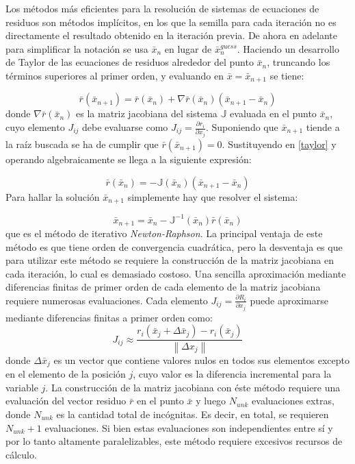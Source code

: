 Los métodos más eficientes para la resolución de sistemas de ecuaciones de residuos son métodos implícitos,
en los que la semilla para cada iteración no es directamente el resultado obtenido en la iteración previa.
De ahora en adelante para simplificar la notación se usa $\bar{x}_n$ en lugar de $\bar{x}^{guess}_n$.
Haciendo un desarrollo de Taylor de las ecuaciones de residuos alrededor del punto $\bar{x}_n$, 
truncando los términos superiores al primer orden, y evaluando en $\bar{x}=\bar{x}_{n+1}$ se tiene:

\begin{equation}
\bar{r}(\bar{x}_{n+1}) = \bar{r}(\bar{x}_n) + \nabla \bar{r}(\bar{x}_n)(\bar{x}_{n+1}-\bar{x}_n)
\label{taylor}
\end{equation}
donde $\nabla \bar{r}(\bar{x}_n)$ es la matriz jacobiana del sistema $\mathbb{J}$ evaluada en el punto $\bar{x}_n$, 
cuyo elemento $J_{ij}$ debe evaluarse como $J_{ij}=\frac{\partial r_i}{\partial x_j}$.
Suponiendo que ${\bar{x}_{n+1}}$ tiende a la raíz buscada se ha de cumplir que $\bar{r}(\bar{x}_{n+1})=0$.
Sustituyendo en \ref{taylor} y operando algebraicamente se llega a la siguiente expresión:

\begin{equation}
\bar{r}(\bar{x}_n) = -\mathbb{J}(\bar{x}_n)(\bar{x}_{n+1}-\bar{x}_n)
\end{equation}
Para hallar la solución $\bar{x}_{n+1}$ simplemente hay que resolver el sistema:

\begin{equation}
\bar{x}_{n+1} = \bar{x}_{n} -\mathbb{J}^{-1}(\bar{x}_n)\bar{r}(\bar{x}_n)
\end{equation}
que es el método de iterativo \textit{Newton-Raphson}.
La principal ventaja de este método es que tiene orden de convergencia cuadrática,
pero la desventaja es que para utilizar este método se requiere la construcción de la matriz jacobiana en cada iteración, lo cual es demasiado costoso.
Una sencilla aproximación mediante diferencias finitas de primer orden de cada elemento de la matriz jacobiana requiere numerosas evaluaciones.
Cada elemento $J_{ij}=\frac{\partial R_i}{\partial x_j}$ puede aproximarse mediante diferencias finitas a primer orden como:
\begin{equation}
J_{ij} \approx \frac{r_i(\bar{x}_j + \Delta \bar{x}_j) - r_i(\bar{x}_j)}{\left\|\Delta x_j\right\|}
\label{j-diff}
\end{equation}
donde $\Delta \bar{x}_j$ es un vector que contiene valores nulos en todos sus elementos excepto en el elemento de la posición $j$,
cuyo valor es la diferencia incremental para la variable $j$.
La construcción de la matriz jacobiana con éste método requiere una evaluación del vector residuo $\bar{r}$ en el punto $\bar{x}$ y luego $N_{unk}$ evaluaciones extras,
donde $N_{unk}$ es la cantidad total  de incógnitas. 
Es decir, en total, se requieren $N_{unk}+1$ evaluaciones.
Si bien estas evaluaciones son independientes entre sí y por lo tanto altamente paralelizables, este método requiere excesivos recursos de cálculo.

